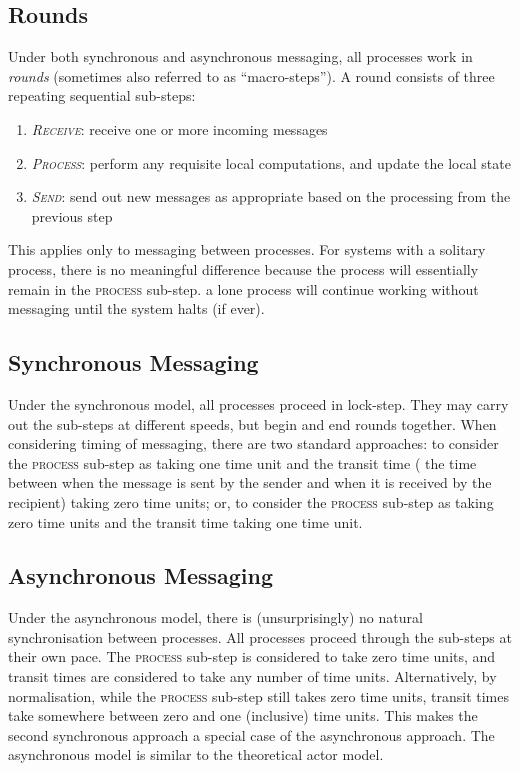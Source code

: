 \subsection{Rounds}
Under both synchronous and asynchronous messaging, all processes work in \emph{rounds} (sometimes also referred to as ``macro-steps'').  A round consists of three repeating sequential sub-steps:
\begin{enumerate}
    \item \emph{\textsc{Receive}}:  receive one or more incoming messages
    \item \emph{\textsc{Process}}:  perform any requisite local computations, and update the local state
    \item \emph{\textsc{Send}}:  send out new messages as appropriate based on the processing from the previous step
\end{enumerate}
This applies only to messaging between processes.  For systems with a solitary process, there is no meaningful difference because the process will essentially remain in the \textsc{process} sub-step.  \Ie{} a lone process will continue working without messaging until the system halts (if ever).


\subsection{Synchronous Messaging}
Under the synchronous model, all processes proceed in lock-step.  They may carry out the sub-steps at different speeds, but begin and end rounds together.  When considering timing of messaging, there are two standard approaches:  to consider the \textsc{process} sub-step as taking one time unit and the transit time (\ie{} the time between when the message is sent by the sender and when it is received by the recipient) taking zero time units; or, to consider the \textsc{process} sub-step as taking zero time units and the transit time taking one time unit.

\subsection{Asynchronous Messaging}
Under the asynchronous model, there is (unsurprisingly) no natural synchronisation between processes.  All processes proceed through the sub-steps at their own pace.  The \textsc{process} sub-step is considered to take zero time units, and transit times are considered to take any number of time units.  Alternatively, by normalisation, while the \textsc{process} sub-step still takes zero time units, transit times take somewhere between zero and one (inclusive) time units.  This makes the second synchronous approach a special case of the asynchronous approach.  The asynchronous model is similar to the theoretical \gls{actor} model.

